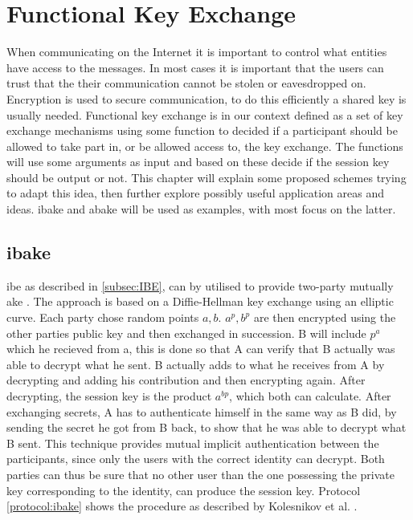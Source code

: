 \chapter{Functional Key Exchange}\label{chp:funckeyenc} 
When communicating on the Internet it is important to control what entities have access to the messages. In most cases it is important that the users can trust that the their communication cannot be stolen or eavesdropped on. Encryption is used to secure communication, to do this efficiently a shared key is usually needed. Functional key exchange is in our context defined as a set of key exchange mechanisms using some function to decided if a participant should be allowed to take part in, or be allowed access to, the key exchange. The functions will use some arguments as input and based on these decide if the session key should be output or not. This chapter will explain some proposed schemes trying to adapt this idea, then further explore possibly useful application areas and ideas. \Gls{ibake} and \gls{abake} will be used as examples, with most focus on the latter.

\section{\Glsdesc{ibake}}
\Gls{ibe} as described in \ref{subsec:IBE}, can by utilised to provide two-party mutually \gls{ake} \cite{ibake}. The approach is based on a Diffie-Hellman key exchange using an elliptic curve. Each party chose random points $a,b$. $a^p, b^p$ are then encrypted using the other parties public key and then exchanged in succession. B will include $p^a$ which he recieved from a, this is done so that A can verify that B actually was able to decrypt what he sent. B actually adds to what he receives from A by decrypting and adding his contribution and then encrypting again. After decrypting, the session key is the product $a^{bp}$, which both can calculate. After exchanging secrets, A has to authenticate himself in the same way as B did, by sending the secret he got from B back, to show that he was able to decrypt what B sent. This technique provides mutual implicit authentication between the participants, since only the users with the correct identity can decrypt. Both parties can thus be sure that no other user than the one possessing the private key corresponding to the identity, can produce the session key. Protocol \ref{protocol:ibake} shows the procedure as described by Kolesnikov et al. \cite{ibake}.

